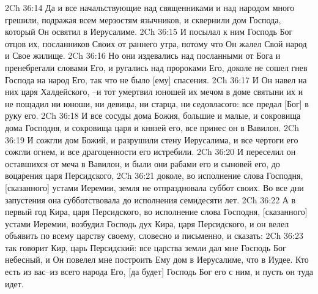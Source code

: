 2Ch 36:14  Да и все начальствующие над священниками и над народом много грешили, подражая всем мерзостям язычников, и сквернили дом Господа, который Он освятил в Иерусалиме.
2Ch 36:15  И посылал к ним Господь Бог отцов их, посланников Своих от раннего утра, потому что Он жалел Свой народ и Свое жилище.
2Ch 36:16  Но они издевались над посланными от Бога и пренебрегали словами Его, и ругались над пророками Его, доколе не сошел гнев Господа на народ Его, так что не было [ему] спасения.
2Ch 36:17  И Он навел на них царя Халдейского, --и тот умертвил юношей их мечом в доме святыни их и не пощадил ни юноши, ни девицы, ни старца, ни седовласого: все предал [Бог] в руку его.
2Ch 36:18  И все сосуды дома Божия, большие и малые, и сокровища дома Господня, и сокровища царя и князей его, все принес он в Вавилон.
2Ch 36:19  И сожгли дом Божий, и разрушили стену Иерусалима, и все чертоги его сожгли огнем, и все драгоценности его истребили.
2Ch 36:20  И переселил он оставшихся от меча в Вавилон, и были они рабами его и сыновей его, до воцарения царя Персидского,
2Ch 36:21  доколе, во исполнение слова Господня, [сказанного] устами Иеремии, земля не отпраздновала суббот своих. Во все дни запустения она субботствовала до исполнения семидесяти лет.
2Ch 36:22  А в первый год Кира, царя Персидского, во исполнение слова Господня, [сказанного] устами Иеремии, возбудил Господь дух Кира, царя Персидского, и он велел объявить по всему царству своему, словесно и письменно, и сказать:
2Ch 36:23  так говорит Кир, царь Персидский: все царства земли дал мне Господь Бог небесный, и Он повелел мне построить Ему дом в Иерусалиме, что в Иудее. Кто есть из вас--из всего народа Его, [да будет] Господь Бог его с ним, и пусть он туда идет.


